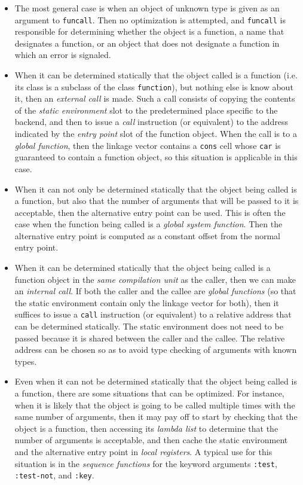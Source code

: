 \begin{itemize}
\item The most general case is when an object of unknown type is given
  as an argument to \texttt{funcall}.  Then no optimization is
  attempted, and \texttt{funcall} is responsible for determining
  whether the object is a function, a name that designates a function,
  or an object that does not designate a function in which an error is
  signaled.
\item When it can be determined statically that the object called is a
  function (i.e. its class is a subclass of the class
  \texttt{function}), but nothing else is know about it, then an
  \emph{external call} is made.  Such a call consists of copying the
  contents of the \emph{static environment} slot to the predetermined
  place specific to the backend, and then to issue a \emph{call}
  instruction (or equivalent) to the address indicated by the
  \emph{entry point} slot of the function object.  When the
  call is to a \emph{global function}, then the linkage vector contains
  a \texttt{cons} cell whose \texttt{car} is guaranteed to contain a
  function object, so this situation is applicable in this case.
\item When it can not only be determined statically that the object
  being called is a function, but also that the number of arguments
  that will be passed to it is acceptable, then the alternative entry
  point can be used.  This is often the case when the function being
  called is a \emph{global system function}.  Then the alternative
  entry point is computed as a constant offset from the normal entry
  point.
\item When it can be determined statically that the object being
  called is a function object in the \emph{same compilation unit} as
  the caller, then we can make an \emph{internal call}.  If both the
  caller and the callee are \emph{global functions} (so that the
  static environment contain only the linkage vector for both), then
  it suffices to issue a \texttt{call} instruction (or equivalent) to
  a relative address that can be determined statically.  The static
  environment does not need to be passed because it is shared between
  the caller and the callee.  The relative address can be chosen so as
  to avoid type checking of arguments with known types.
\item Even when it can not be determined statically that the object
  being called is a function, there are some situations that can be
  optimized.  For instance, when it is likely that the object is going
  to be called multiple times with the same number of arguments, then
  it may pay off to start by checking that the object is a function,
  then accessing its \emph{lambda list} to determine that the number
  of arguments is acceptable, and then cache the static environment
  and the alternative entry point in \emph{local registers}.  A
  typical use for this situation is in the \emph{sequence functions}
  for the keyword arguments \texttt{:test}, \texttt{:test-not}, and
  \texttt{:key}.
\end{itemize}
